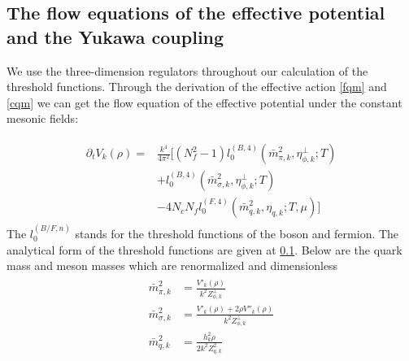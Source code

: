 \documentclass[%
reprint,
superscriptaddress,
showpacs,preprintnumbers,
 amsmath,amssymb,
 aps,
prd,
]{revtex4-1}
\begin{document}



\subsection{The flow equations of the effective potential and the Yukawa coupling}
We use the three-dimension regulators throughout our calculation of the threshold functions. 
Through the derivation of the effective action \ref{fqm} and \ref{cqm} we can get the flow equation of the effective potential under the 
constant mesonic fields:

\begin{align}
\begin{split}
\partial_tV_k(\rho)=&\frac{k^4}{4\pi^2}[(N^2_f-1)l^{(B,4)}_{0}(\bar{m}^{2}_{\pi,k},\eta^{\bot}_{\phi,k};T)\\
&+l^{(B,4)}_{0}(\bar{m}^{2}_{\sigma,k},\eta^{\bot}_{\phi,k};T)\\
&-4N_cN_fl^{(F,4)}_{0}(\bar{m}^{2}_{q,k},\eta_{q,k};T,\mu)]
\end{split}
\end{align}
The $l_0^{(B/F,n)}$ stands for the threshold functions of the boson and fermion. The analytical form of the threshold 
functions are given at \ref{}. Below are the quark mass and meson masses which are renormalized and dimensionless
\begin{align}
\begin{split}
\bar{m}^{2}_{\pi,k}&=\frac{V'_k(\rho)}{k^2Z^{\bot}_{\phi,k}}\\
\bar{m}^{2}_{\sigma,k}&=\frac{V'_k(\rho)+2\rho V''_k(\rho)}{k^2Z^{\bot}_{\phi,k}}\\
\bar{m}^{2}_{q,k}&=\frac{h^{2}_{k}\rho}{2k^2Z^{2}_{q,k}}
\end{split}
\end{align}
\end{document}
